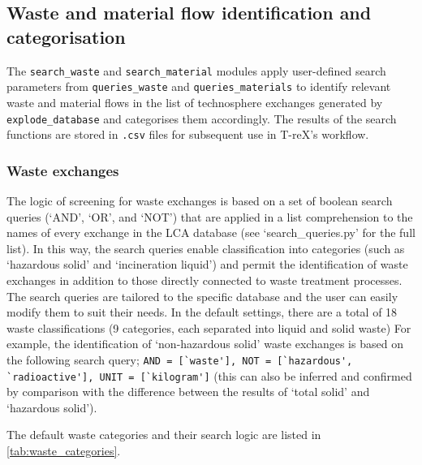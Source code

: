 \documentclass{article}
\renewcommand{\texttt}[1]{{\ttfamily\small\nolinkurl{#1}}}
\begin{document}
\subsection{Waste and material flow identification and categorisation}

The \texttt{search\_waste} and \texttt{search\_material} modules apply user-defined search parameters from \texttt{queries\_waste} and \texttt{queries\_materials} to identify relevant waste and material flows in the list of technosphere exchanges generated by \texttt{explode\_database} and categorises them accordingly. The results of the search functions are stored in \texttt{.csv} files for subsequent use in T-reX's workflow.

\subsubsection{Waste exchanges}\label{sec:method-T-reX-waste_exchanges}


The logic of screening for waste exchanges is based on a set of boolean search queries (`AND', `OR', and `NOT') that are applied in a list comprehension to the names of every exchange in the LCA database (see `search\_queries.py' for the full list). In this way, the search queries enable classification into categories (such as `hazardous solid' and `incineration liquid') and permit the identification of waste exchanges in addition to those directly connected to waste treatment processes. The search queries are tailored to the specific database and the user can easily modify them to suit their needs. In the default settings, there are a total of 18 waste classifications (9 categories, each separated into liquid and solid waste) For example, the identification of `non-hazardous solid' waste exchanges is based on the following search query; \texttt{AND = [`waste'], NOT = [`hazardous', `radioactive'], UNIT = [`kilogram']} (this can also be inferred and confirmed by comparison with the difference between the results of `total solid' and `hazardous solid').

The default waste categories and their search logic are listed in \autoref{tab:waste_categories}.
\end{document}
